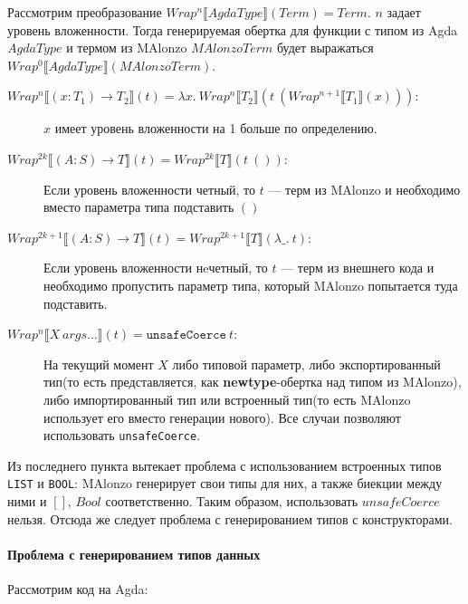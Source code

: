 Рассмотрим преобразование \(Wrap^n\llbracket AgdaType \rrbracket(Term) = Term\).
\(n\) задает уровень вложенности. Тогда генерируемая
обертка для функции с типом из Agda \(AgdaType\) и термом из MAlonzo \(MAlonzoTerm\)
будет выражаться \(Wrap^0\llbracket AgdaType \rrbracket(MAlonzoTerm)\).

\begin{description}
\item[\(Wrap^n\llbracket (x : T_1) \rightarrow T_2 \rrbracket(t) =
   \lambda x.\ Wrap^n\llbracket T_2 \rrbracket(t\ (
   Wrap^{n+1}\llbracket T_1 \rrbracket(x)))\):]
\(x\) имеет уровень вложенности на 1 больше по определению.
\item[\(Wrap^{2k}\llbracket (A : S) \rightarrow T \rrbracket(t) =
   Wrap^{2k}\llbracket T \rrbracket(t\ ())\):]
Если уровень вложенности четный, то \(t\) --- терм из MAlonzo и необходимо
вместо параметра типа подставить \(()\)

\item[\(Wrap^{2k + 1}\llbracket (A : S) \rightarrow T \rrbracket(t) =
   Wrap^{2k + 1}\llbracket T \rrbracket(\lambda \_.\ t)\):]
Если уровень вложенности нeчетный, то \(t\) --- терм из внешнего кода и необходимо
пропустить параметр типа, который MAlonzo попытается туда подставить.

\item[\(Wrap^n\llbracket X\ args\dots \rrbracket(t) = \texttt{unsafeCoerce}\ t\):]
На текущий момент \(X\) либо типовой параметр, либо экспортированный тип(то
есть представляется, как \textbf{newtype}-обертка над типом из MAlonzo),
либо импортированный тип или встроенный тип(то есть MAlonzo использует его
вместо генерации нового). Все случаи позволяют использовать \texttt{unsafeCoerce}.
\end{description}

Из последнего пункта вытекает проблема с использованием встроенных типов
\texttt{LIST} и \texttt{BOOL}: MAlonzo генерирует свои типы для них, а также
биекции между ними и \([]\), \(Bool\) соответственно. Таким образом, использовать
\(unsafeCoerce\) нельзя. Отсюда же следует проблема с генерированием типов
с конструкторами.

\paragraph{Проблема с генерированием типов данных}

Рассмотрим код на Agda:

